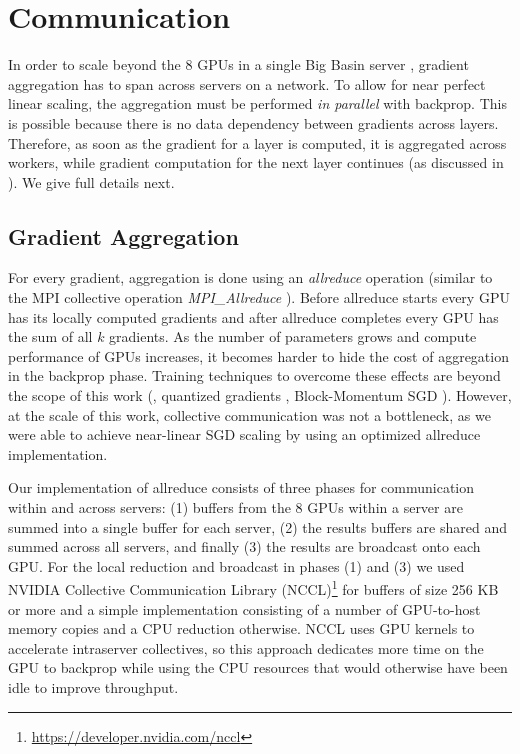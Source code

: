 \documentclass[10pt,twocolumn,letterpaper]{article}
\begin{document}
\section{Communication}\label{sec:commhw}

In order to scale beyond the 8 GPUs in a single Big Basin server \cite{Lee2017}, gradient aggregation has to span across servers on a network. To allow for near perfect linear scaling, the aggregation must be performed \emph{in parallel} with backprop. This is possible because there is no data dependency between gradients across layers. Therefore, as soon as the gradient for a layer is computed, it is aggregated across workers, while gradient computation for the next layer continues (as discussed in \cite{Chen2016}). We give full details next.

\subsection{Gradient Aggregation}

For every gradient, aggregation is done using an \emph{allreduce} operation (similar to the MPI collective operation \emph{MPI\_Allreduce} \cite{gropp1999}). Before allreduce starts every GPU has its locally computed gradients and after allreduce completes every GPU has the sum of all $k$ gradients. As the number of parameters grows and compute performance of GPUs increases, it becomes harder to hide the cost of aggregation in the backprop phase. Training techniques to overcome these effects are beyond the scope of this work (\eg, quantized gradients \cite{Hubara2016}, Block-Momentum SGD \cite{ChenHuo2016}). However, at the scale of this work, collective communication was not a bottleneck, as we were able to achieve near-linear SGD scaling by using an optimized allreduce implementation.

Our implementation of allreduce consists of three phases for communication within and across servers: (1) buffers from the 8 GPUs within a server are summed into a single buffer for each server, (2) the results buffers are shared and summed across all servers, and finally (3) the results are broadcast onto each GPU. For the local reduction and broadcast in phases (1) and (3) we used NVIDIA Collective Communication Library (NCCL)\footnote{\url{https://developer.nvidia.com/nccl}} for buffers of size 256 KB or more and a simple implementation consisting of a number of GPU-to-host memory copies and a CPU reduction otherwise. NCCL uses GPU kernels to accelerate intraserver collectives, so this approach dedicates more time on the GPU to backprop while using the CPU resources that would otherwise have been idle to improve throughput.
\end{document}
